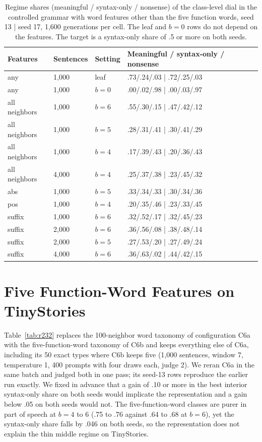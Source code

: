 \documentclass[11pt,letterpaper]{article}
\begin{document}
\begin{table}[h]
\caption{Regime shares (meaningful / syntax-only / nonsense) of the class-level dial in the controlled grammar with word features other than the five function words, seed 13 | seed 17, 1,600 generations per cell. The leaf and $b=0$ rows do not depend on the features. The target is a syntax-only share of .5 or more on both seeds.}
\label{tab:r231}
\begin{center}
\footnotesize
\begin{tabular}{llll}
\toprule
Features & Sentences & Setting & Meaningful / syntax-only / nonsense \\
\midrule
any & 1,000 & leaf & .73/.24/.03 \;|\; .72/.25/.03 \\
any & 1,000 & $b=0$ & .00/.02/.98 \;|\; .00/.03/.97 \\
all neighbors & 1,000 & $b=6$ & .55/.30/.15 \;|\; .47/.42/.12 \\
all neighbors & 1,000 & $b=5$ & .28/.31/.41 \;|\; .30/.41/.29 \\
all neighbors & 1,000 & $b=4$ & .17/.39/.43 \;|\; .20/.36/.43 \\
all neighbors & 4,000 & $b=4$ & .25/.37/.38 \;|\; .23/.45/.32 \\
abs & 1,000 & $b=5$ & .33/.34/.33 \;|\; .30/.34/.36 \\
pos & 1,000 & $b=4$ & .20/.35/.46 \;|\; .23/.33/.45 \\
suffix & 1,000 & $b=6$ & .32/.52/.17 \;|\; .32/.45/.23 \\
suffix & 2,000 & $b=6$ & .36/.56/.08 \;|\; .38/.48/.14 \\
suffix & 2,000 & $b=5$ & .27/.53/.20 \;|\; .27/.49/.24 \\
suffix & 4,000 & $b=6$ & .36/.63/.02 \;|\; .44/.42/.15 \\
\bottomrule
\end{tabular}
\end{center}
\end{table}


\section{Five Function-Word Features on TinyStories}

Table~\ref{tab:r232} replaces the 100-neighbor word taxonomy of configuration C6a with the five-function-word taxonomy of C6b and keeps everything else of C6a, including its 50 exact types where C6b keeps five (1,000 sentences, window 7, temperature 1, 400 prompts with four draws each, judge 2). We reran C6a in the same batch and judged both in one pass; its seed-13 rows reproduce the earlier run exactly. We fixed in advance that a gain of .10 or more in the best interior syntax-only share on both seeds would implicate the representation and a gain below .05 on both seeds would not. The five-function-word classes are purer in part of speech at $b=4$ to 6 (.75 to .76 against .64 to .68 at $b=6$), yet the syntax-only share falls by .046 on both seeds, so the representation does not explain the thin middle regime on TinyStories.
\end{document}
